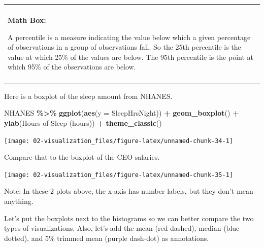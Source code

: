 \documentclass[
]{book}
\newenvironment{Shaded}{\begin{snugshade}}{\end{snugshade}}
\newcommand{\AttributeTok}[1]{\textcolor[rgb]{0.13,0.29,0.53}{#1}}
\newcommand{\FunctionTok}[1]{\textcolor[rgb]{0.13,0.29,0.53}{\textbf{#1}}}
\newcommand{\NormalTok}[1]{#1}
\newcommand{\SpecialCharTok}[1]{\textcolor[rgb]{0.81,0.36,0.00}{\textbf{#1}}}
\newcommand{\StringTok}[1]{\textcolor[rgb]{0.31,0.60,0.02}{#1}}
\newenvironment{mathbox}
{
    \begin{center}
    
    \begin{tabular}{|p{0.8\textwidth}|}
    \rowcolor{LightYellow}
    \hline\\
    \rowcolor{LightYellow}
    \textbf{Math Box:}
}
{
    \\\rowcolor{LightYellow}
    \\\hline
    \end{tabular} 
    \end{center}
}
\begin{document}
\begin{mathbox}
A percentile is a measure indicating the value below which a given
percentage of observations in a group of observations fall. So the 25th
percentile is the value at which 25\% of the values are below. The 95th
percentile is the point at which 95\% of the observations are below.
\end{mathbox}

Here is a boxplot of the sleep amount from NHANES.

\begin{Shaded}
\begin{Highlighting}[]
\NormalTok{NHANES }\SpecialCharTok{\%\textgreater{}\%}
    \FunctionTok{ggplot}\NormalTok{(}\FunctionTok{aes}\NormalTok{(}\AttributeTok{y =}\NormalTok{ SleepHrsNight)) }\SpecialCharTok{+}
    \FunctionTok{geom\_boxplot}\NormalTok{() }\SpecialCharTok{+} 
    \FunctionTok{ylab}\NormalTok{(}\StringTok{\textquotesingle{}Hours of Sleep (hours)\textquotesingle{}}\NormalTok{) }\SpecialCharTok{+} 
    \FunctionTok{theme\_classic}\NormalTok{() }
\end{Highlighting}
\end{Shaded}

\begin{center}\texttt{[image: 02-visualization\_files/figure-latex/unnamed-chunk-34-1]} \end{center}

Compare that to the boxplot of the CEO salaries.

\begin{Shaded}
\end{Shaded}

\begin{center}\texttt{[image: 02-visualization\_files/figure-latex/unnamed-chunk-35-1]} \end{center}

Note: In these 2 plots above, the x-axis has number labels, but they don't mean anything.

Let's put the boxplots next to the histograms so we can better compare the two types of visualizations. Also, let's add the mean (red dashed), median (blue dotted), and 5\% trimmed mean (purple dash-dot) as annotations.
\end{document}
